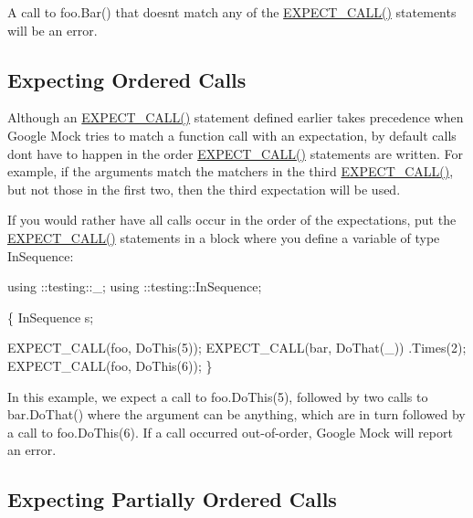A call to {\ttfamily foo.\+Bar()} that doesn\textquotesingle{}t match any of the {\ttfamily \hyperlink{gmock-spec-builders_8h_a535a6156de72c1a2e25a127e38ee5232}{E\+X\+P\+E\+C\+T\+\_\+\+C\+A\+L\+L()}} statements will be an error.

\subsection*{Expecting Ordered Calls}

Although an {\ttfamily \hyperlink{gmock-spec-builders_8h_a535a6156de72c1a2e25a127e38ee5232}{E\+X\+P\+E\+C\+T\+\_\+\+C\+A\+L\+L()}} statement defined earlier takes precedence when Google Mock tries to match a function call with an expectation, by default calls don\textquotesingle{}t have to happen in the order {\ttfamily \hyperlink{gmock-spec-builders_8h_a535a6156de72c1a2e25a127e38ee5232}{E\+X\+P\+E\+C\+T\+\_\+\+C\+A\+L\+L()}} statements are written. For example, if the arguments match the matchers in the third {\ttfamily \hyperlink{gmock-spec-builders_8h_a535a6156de72c1a2e25a127e38ee5232}{E\+X\+P\+E\+C\+T\+\_\+\+C\+A\+L\+L()}}, but not those in the first two, then the third expectation will be used.

If you would rather have all calls occur in the order of the expectations, put the {\ttfamily \hyperlink{gmock-spec-builders_8h_a535a6156de72c1a2e25a127e38ee5232}{E\+X\+P\+E\+C\+T\+\_\+\+C\+A\+L\+L()}} statements in a block where you define a variable of type {\ttfamily In\+Sequence}\+:


\begin{DoxyCode}
using ::testing::\_;
using ::testing::InSequence;

\{
  InSequence s;

  EXPECT\_CALL(foo, DoThis(5));
  EXPECT\_CALL(bar, DoThat(\_))
      .Times(2);
  EXPECT\_CALL(foo, DoThis(6));
\}
\end{DoxyCode}


In this example, we expect a call to {\ttfamily foo.\+Do\+This(5)}, followed by two calls to {\ttfamily bar.\+Do\+That()} where the argument can be anything, which are in turn followed by a call to {\ttfamily foo.\+Do\+This(6)}. If a call occurred out-\/of-\/order, Google Mock will report an error.

\subsection*{Expecting Partially Ordered Calls}

